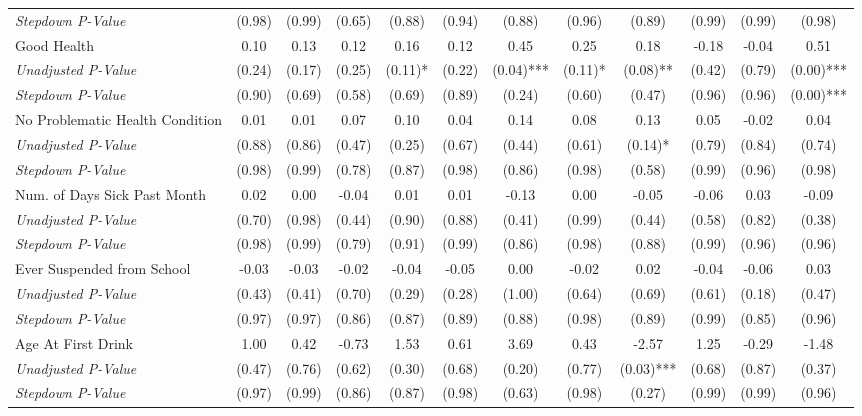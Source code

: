\begin{tabular}{l c c c c c c c c c c c}
\quad \textit{Stepdown P-Value} & (0.98) & (0.99) & (0.65) & (0.88) & (0.94) & (0.88) & (0.96) & (0.89) & (0.99) & (0.99) & (0.98) \\
Good Health & 0.10 & 0.13 & 0.12 & 0.16 & 0.12 & 0.45 & 0.25 & 0.18 & -0.18 & -0.04 & 0.51 \\
\quad \textit{Unadjusted P-Value} & (0.24) & (0.17) & (0.25) & (0.11)* & (0.22) & (0.04)*** & (0.11)* & (0.08)** & (0.42) & (0.79) & (0.00)*** \\
\quad \textit{Stepdown P-Value} & (0.90) & (0.69) & (0.58) & (0.69) & (0.89) & (0.24) & (0.60) & (0.47) & (0.96) & (0.96) & (0.00)*** \\
No Problematic Health Condition & 0.01 & 0.01 & 0.07 & 0.10 & 0.04 & 0.14 & 0.08 & 0.13 & 0.05 & -0.02 & 0.04 \\
\quad \textit{Unadjusted P-Value} & (0.88) & (0.86) & (0.47) & (0.25) & (0.67) & (0.44) & (0.61) & (0.14)* & (0.79) & (0.84) & (0.74) \\
\quad \textit{Stepdown P-Value} & (0.98) & (0.99) & (0.78) & (0.87) & (0.98) & (0.86) & (0.98) & (0.58) & (0.99) & (0.96) & (0.98) \\
Num. of Days Sick Past Month & 0.02 & 0.00 & -0.04 & 0.01 & 0.01 & -0.13 & 0.00 & -0.05 & -0.06 & 0.03 & -0.09 \\
\quad \textit{Unadjusted P-Value} & (0.70) & (0.98) & (0.44) & (0.90) & (0.88) & (0.41) & (0.99) & (0.44) & (0.58) & (0.82) & (0.38) \\
\quad \textit{Stepdown P-Value} & (0.98) & (0.99) & (0.79) & (0.91) & (0.99) & (0.86) & (0.98) & (0.88) & (0.99) & (0.96) & (0.96) \\
Ever Suspended from School & -0.03 & -0.03 & -0.02 & -0.04 & -0.05 & 0.00 & -0.02 & 0.02 & -0.04 & -0.06 & 0.03 \\
\quad \textit{Unadjusted P-Value} & (0.43) & (0.41) & (0.70) & (0.29) & (0.28) & (1.00) & (0.64) & (0.69) & (0.61) & (0.18) & (0.47) \\
\quad \textit{Stepdown P-Value} & (0.97) & (0.97) & (0.86) & (0.87) & (0.89) & (0.88) & (0.98) & (0.89) & (0.99) & (0.85) & (0.96) \\
Age At First Drink & 1.00 & 0.42 & -0.73 & 1.53 & 0.61 & 3.69 & 0.43 & -2.57 & 1.25 & -0.29 & -1.48 \\
\quad \textit{Unadjusted P-Value} & (0.47) & (0.76) & (0.62) & (0.30) & (0.68) & (0.20) & (0.77) & (0.03)*** & (0.68) & (0.87) & (0.37) \\
\quad \textit{Stepdown P-Value} & (0.97) & (0.99) & (0.86) & (0.87) & (0.98) & (0.63) & (0.98) & (0.27) & (0.99) & (0.99) & (0.96) \\
\bottomrule
\end{tabular}
